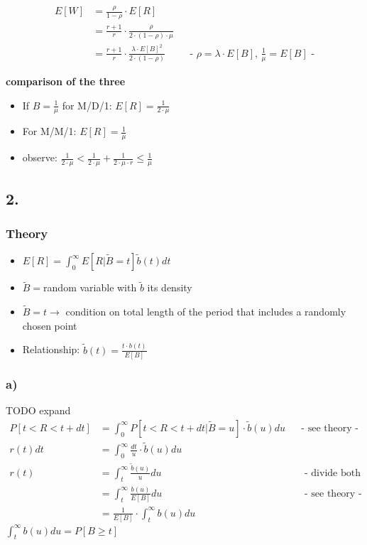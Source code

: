 \begin{align*}
E\left[W\right]&=\frac{\rho }{1-\rho }\cdot E\left[R\right]\\
&=\frac{r+1}{r}\cdot \frac{\rho }{2\cdot \left(1-\rho \right)\cdot \mu }\\
&=\frac{r+1}{r}\cdot \frac{\lambda \cdot E\left[B\right]^{2}}{2\cdot \left(1-\rho \right)}&& \text{-  $\rho =\lambda \cdot E\left[B\right]$, $\frac{1}{\mu }=E\left[B\right]$ -}
\end{align*}

\textbf{comparison of the three}\\

\begin{itemize}
\item  If $B=\frac{1}{\mu }$ for M/D/1: $E\left[R\right]=\frac{1}{2\cdot \mu }$
\item  For M/M/1: $E\left[R\right]=\frac{1}{\mu }$
\item  observe: $\frac{1}{2\cdot \mu }< \frac{1}{2\cdot \mu }+\frac{1}{2\cdot \mu \cdot r}\le \frac{1}{\mu }$
\end{itemize}

\subsection*{ 2. }

\subsubsection*{ Theory }

\begin{itemize}
\item  $E[R] = \int_0^{\infty} E[R | \tilde{B} = t] \tilde{b}(t) dt$
\item  $\tilde{B} =$random variable with $\tilde{b}$ its density
\item  $\tilde{B} = t \rightarrow$ condition on total length of the period that includes a randomly chosen point
\item  Relationship: $\tilde{b}(t) = \frac{t \cdot b(t)}{E[B]}$
\end{itemize}

\subsubsection*{ a) }

TODO expand
\begin{align*}
P\left[t< R< t+dt\right]&=\int _{0}^{\infty }P\left[t< R< t+dt|\widetilde{B}=u\right]\cdot \widetilde{b}\left(u\right)du && \text{- see theory -}\\
r(t)dt &= \int _{0}^{\infty } \frac{dt}{u}\cdot \widetilde{b}\left(u\right)du\\
r\left(t\right)&=\int _{t}^{\infty }\frac{\widetilde{b}(u)}{u}du && \text{ - divide both sides by dt - }\\
&=\int _{t}^{\infty }\frac{b\left(u\right)}{E\left[B\right]}du && \text{ - see theory - }\\
&=\frac{1}{E\left[B\right]}\cdot \int _{t}^{\infty }b\left(u\right)du
\end{align*}
$\int _{t}^{\infty }b\left(u\right)du=P\left[B\ge t\right]$

